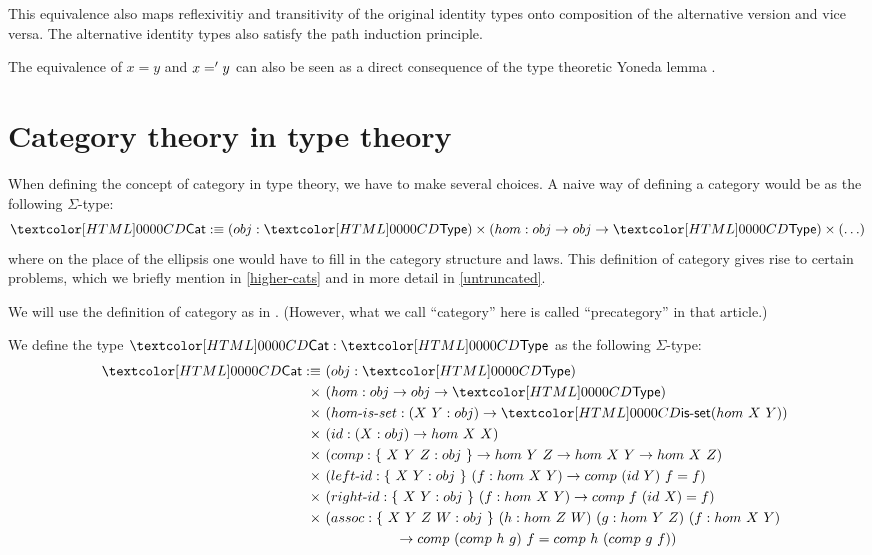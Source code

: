 This equivalence also maps reflexivitiy and transitivity of the
original identity types onto composition of the alternative version
and vice versa. The alternative identity types also satisfy the path
induction principle.

The equivalence of $x = y$ and $x =' y$ can also be seen as a
direct consequence of the type theoretic Yoneda lemma
\cite{Rijke2012}.

\section{Category theory in type theory}

When defining the concept of category in type theory, we have to make
several choices. A naive way of defining a category would be as the
following $\Sigma$-type:
$$
\Cat \ddefeq (obj : \Type) \times (hom : obj \to obj \to \Type) \times (\hdots)
$$
where on the place of the ellipsis one would have to fill in the
category structure and laws. This definition of category gives rise to
certain problems, which we briefly mention in \cref{higher-cats} and
in more detail in \cref{untruncated}.

We will use the definition of category as in
\cite{Ahrens2015}. (However, what we call ``category'' here is called
``precategory'' in that article.)

\begin{definition}[Category]
  We define the type $\Cat : \Type$ as the following $\Sigma$-type:
  \begin{align*}
    &&\Cat \ddefeq &\ (obj : \Type) \\
         &&\times  &\ (hom : obj \to obj \to \Type) \\
         &&\times  &\ (\identalt{hom-is-set} : (X\ Y : obj) \to \isset (hom\ X\ Y)) \\
         &&\times  &\ (id : (X : obj) \to hom\ X\ X) \\
         &&\times  &\ (comp : \{\ X\ Y\ Z : obj\ \} \to hom\ Y\ Z \to hom\ X\ Y \to hom\ X\ Z) \\
         &&\times  &\ (\identalt{left-id} : \{\ X\ Y : obj\ \}\ (f : hom\ X\ Y) \to comp\ (id\ Y)\ f = f) \\
         &&\times  &\ (\identalt{right-id} : \{\ X\ Y : obj\ \}\ (f : hom\ X\ Y) \to comp\ f\ (id\ X) = f) \\
         &&\times  &\ (assoc : \{\ X\ Y\ Z\ W : obj\ \}\ (h : hom\ Z\ W)\ (g : hom\ Y\ Z)\ (f : hom\ X\ Y) \\
         && &\ \ \ \ \ \ \ \ \ \ \ \ \ \ \ \ \to comp\ (comp\ h\ g)\ f = comp\ h\ (comp\ g\ f))
  \end{align*}
\end{definition}

